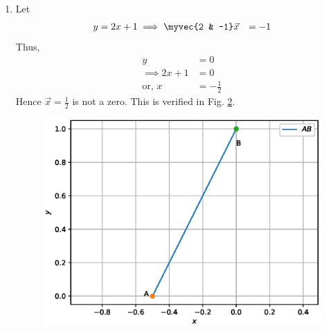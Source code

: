 \begin{enumerate}[label=\arabic*.,ref=\thesubsubsection.\theenumi]
\begin{figure}[!ht]
\caption{}
\label{fig:line3}
\end{figure}
\item Let 
%
\begin{align}
y &= 2x + 1
\implies \myvec{2 & -1}\vec{x} &= -1
\end{align}
%
Thus, 
%
\begin{align}
y &= 0 
\\
\implies  2x + 1 &=0
\\
\text{or, } x &= -\frac{1}{2}
\end{align}
%
Hence $\vec{x}=\frac{1}{2}$ is not a zero. This is verified in Fig. \ref{fig:line4}.
%
\begin{figure}[!ht]
\includegraphics[width=\columnwidth]{./figs/line/line4.eps}
\caption{}
\label{fig:line4}
\end{figure}
\end{enumerate}